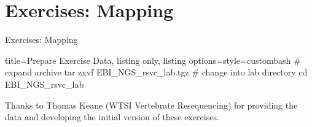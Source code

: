 \documentclass{beamer}
\begin{document}


\section{Exercises: Mapping}

\begin{frame}[fragile]{Exercises: Mapping}
\begin{tcblisting}{title={Prepare Exercise Data}, listing only, listing options={style=custombash}}
# expand archive
tar zxvf EBI_NGS_rsvc_lab.tgz
# change into lab directory
cd EBI_NGS_rsvc_lab
\end{tcblisting}
\footnotesize{Thanks to Thomas Keane (WTSI Vertebrate Resequencing) for providing the data and developing the initial version of these exercises. }
\end{frame}
\end{document}

